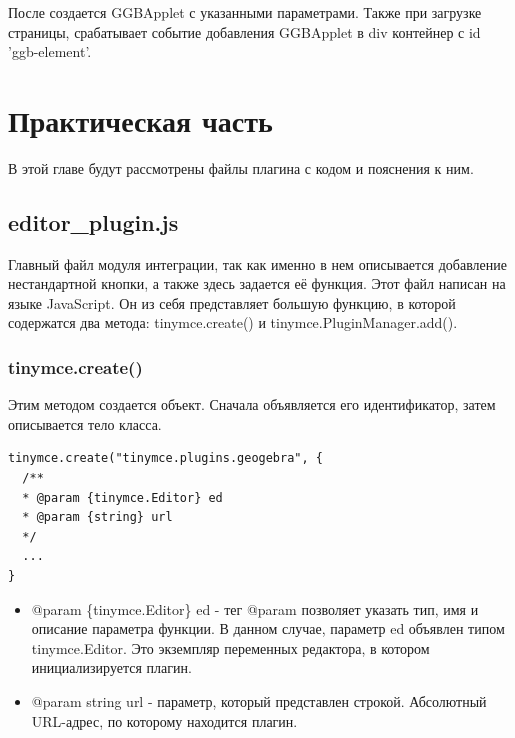 \documentclass[14pt,Diplom]{diplomwork}
\begin{document}
После создается GGBApplet с указанными параметрами. Также при загрузке страницы, срабатывает событие добавления GGBApplet в div контейнер с id 'ggb-element'.


 
\chapter{Практическая часть}
В этой главе будут рассмотрены файлы плагина с кодом и пояснения к ним. 
\section{editor\_plugin.js}
Главный файл модуля интеграции, так как именно в нем описывается добавление нестандартной кнопки, а также здесь задается её функция. Этот файл написан на языке JavaScript. Он из себя представляет большую функцию, в которой содержатся два метода: tinymce.create() и tinymce.PluginManager.add().

\subsection{tinymce.create()}
Этим методом создается объект. Сначала объявляется его идентификатор, затем описывается тело класса.

\begin{verbatim} 
tinymce.create("tinymce.plugins.geogebra", {
  /**
  * @param {tinymce.Editor} ed 
  * @param {string} url 
  */
  ...
}
\end{verbatim}

\begin{itemize}
	\item   @param \{tinymce.Editor\} ed  - тег @param позволяет указать тип, имя и описание параметра функции. В данном случае, параметр ed объявлен типом tinymce.Editor. Это экземпляр переменных редактора, в котором инициализируется плагин.
	\item @param {string} url - параметр, который представлен строкой. Абсолютный URL-адрес, по которому находится плагин.
\end{itemize}
\end{document}
